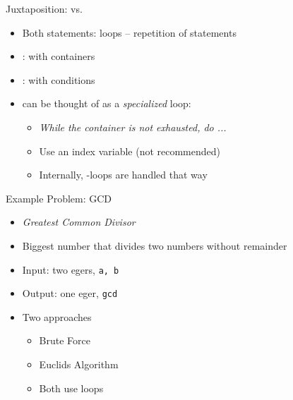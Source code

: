 
\begin{frame}{Juxtaposition:  vs. }
%
\begin{itemize}
\item Both statements: loops -- repetition of statements
\item {}: with containers
\item {}: with conditions
\item {} can be thought of as a \emph{specialized}  loop:
	\begin{itemize}
	\item \emph{While the container is not exhausted, do ...}
	\item Use an index variable (not recommended)
	\item Internally, -loops are handled that way
	\end{itemize}
\end{itemize}
%
\end{frame}


\begin{frame}{Example Problem: GCD}
%
\begin{itemize}
\item \emph{Greatest Common Divisor}
\item Biggest number that divides two numbers without remainder
\item[\Thus] Input: two egers, \texttt{a, b}
\item[\Thus] Output: one eger, \texttt{gcd}
\item Two approaches
	\begin{itemize}
	\item Brute Force
	\item Euclids Algorithm
\item Both use loops
	\end{itemize}
\end{itemize}
%
\end{frame}


